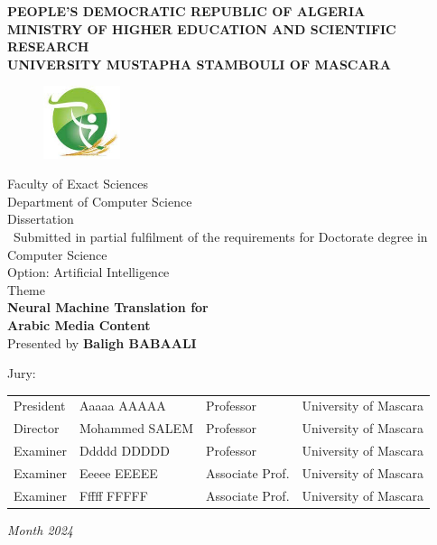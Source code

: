 \thispagestyle{empty}
\begin{center}
	\begin{title}
		\textbf{\uppercase{ People's Democratic Republic of Algeria }} \\[0.2cm]
		\textbf{\uppercase{ MINISTRY OF HIGHER EDUCATION AND SCIENTIFIC RESEARCH }} \\[0.5cm]
		\textbf{\uppercase{ UNIVERSITY MUSTAPHA STAMBOULI OF MASCARA}}
	\end{title}
	\begin{figure}[H]
		\centering
		\label{logo_UD}\includegraphics[width=0.2\textwidth]{Figures/Logo_UM.jpg}
	\end{figure}
	{\large Faculty of Exact Sciences} \\[0.2cm]
	{\large Department of Computer Science} \\[0.2cm]
	{\large Dissertation } \\[0.2cm]
	{\ Submitted in partial fulfilment of the requirements for Doctorate degree in Computer Science} \\[0.2cm]
	{\large Option: Artificial Intelligence}\\[0.5cm]
	
    {\large Theme} \\[0.3cm]
	{\LARGE {\textbf{Neural Machine Translation for\\ Arabic Media Content}}}
	\\[0.7cm]

	{\large Presented by \textbf{Baligh BABAALI} }\\[0.5cm]

\end{center}
Jury:\\
\begin{tabular}{llll}
	President    &  Aaaaa AAAAA & Professor & University of Mascara\\
	Director     &  Mohammed SALEM & Professor & University of Mascara\\
	Examiner     &  Ddddd DDDDD & Professor	& University of Mascara\\
	Examiner	 &  Eeeee EEEEE & Associate Prof.  & University of Mascara\\
	Examiner	 &  Fffff FFFFF & Associate Prof.  & University of Mascara\\
\end{tabular}
\vfill
\begin{center}
	
	\it{Month  2024}
\end{center}